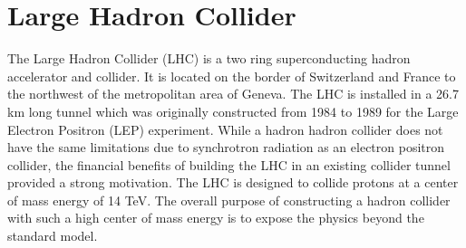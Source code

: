 \chapter{Large Hadron Collider}%
The Large Hadron Collider (LHC) is a two ring superconducting hadron 
accelerator and collider. It is located on the border of Switzerland
and France to the northwest of the metropolitan area of Geneva.
The LHC is installed in a 26.7 km long tunnel which was originally constructed
from 1984 to 1989 for the Large Electron Positron (LEP) experiment. 
While a hadron hadron collider does not have the same limitations
due to synchrotron radiation as an electron positron collider, 
the financial benefits of building the LHC in an existing collider tunnel 
provided a strong motivation. 
The LHC is designed to collide protons at a center of mass energy of 14 TeV.
The overall purpose of constructing a hadron collider with such a high
center of mass energy is to expose the physics beyond the standard model.  

